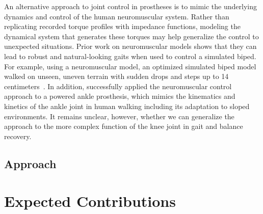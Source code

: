 An alternative approach to joint control in prostheses is to mimic the
underlying dynamics and control of the human neuromuscular system. Rather than
replicating recorded torque profiles with impedance functions, modeling the
dynamical system that generates these torques may help generalize the control to
unexpected situations. Prior work on neuromuscular models shows that they can
lead to robust and natural-looking gaits when used to control a simulated biped.
For example, using a neuromuscular model, an optimized simulated biped model
walked on unseen, uneven terrain with sudden drops and steps up to 14
centimeters~\cite{song2015neural}. In addition, \citet{eilenberg2010control}
successfully applied the neuromuscular control approach to a powered ankle
prosthesis, which mimics the kinematics and kinetics of the ankle joint in human
walking including its adaptation to sloped environments. It remains unclear,
however, whether we can generalize the approach to the more complex function of
the knee joint in gait and balance recovery.

\subsection{Approach}
\section{Expected Contributions}
